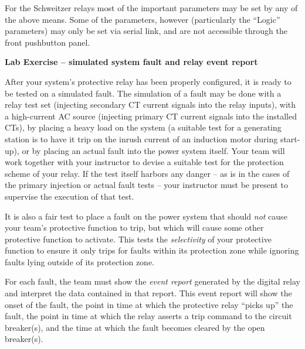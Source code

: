 For the Schweitzer relays most of the important parameters may be set by any of the above means.  Some of the parameters, however (particularly the ``Logic'' parameters) may only be set via serial link, and are not accessible through the front pushbutton panel.













\vfil \eject

\noindent
{\bf Lab Exercise -- simulated system fault and relay event report}

\vskip 5pt

After your system's protective relay has been properly configured, it is ready to be tested on a simulated fault.  The simulation of a fault may be done with a relay test set (injecting secondary CT current signals into the relay inputs), with a high-current AC source (injecting primary CT current signals into the installed CTs), by placing a heavy load on the system (a suitable test for a generating station is to have it trip on the inrush current of an induction motor during start-up), or by placing an actual fault into the power system itself.  Your team will work together with your instructor to devise a suitable test for the protection scheme of your relay.  If the test itself harbors any danger -- as is in the cases of the primary injection or actual fault tests -- your instructor must be present to supervise the execution of that test.

\vskip 10pt

It is also a fair test to place a fault on the power system that should {\it not} cause your team's protective function to trip, but which will cause some other protective function to activate.  This tests the {\it selectivity} of your protective function to ensure it only trips for faults within its protection zone while ignoring faults lying outside of its protection zone.

\vskip 10pt

For each fault, the team must show the {\it event report} generated by the digital relay and interpret the data contained in that report.  This event report will show the onset of the fault, the point in time at which the protective relay ``picks up'' the fault, the point in time at which the relay asserts a trip command to the circuit breaker(s), and the time at which the fault becomes cleared by the open breaker(s).  

